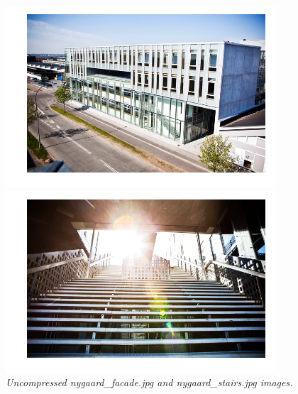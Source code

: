 \documentclass[a4paper,10pt,article,oneside,english]{memoir}
\let\oldcaption\caption
\renewcommand{\caption}[1]{\oldcaption{\emph{#1}}}
\begin{document}
\begin{figure}
	\centering
	\begin{minipage}{.49\textwidth}
		\includegraphics[width=\textwidth]{nygaard_facade_org.png}
	\end{minipage}
	\hfill
	\begin{minipage}{.49\textwidth}
		\includegraphics[width=\textwidth]{nygaard_stairs_org.png}
	\end{minipage}
	\caption{Uncompressed \emph{nygaard\_facade.jpg} and \emph{nygaard\_stairs.jpg} images.}
	\label{fig:uncomp}
\end{figure}
\end{document}
